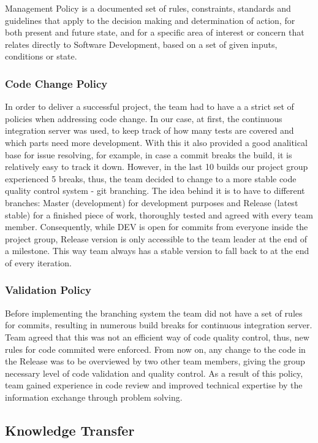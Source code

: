 \documentclass[10pt]{article}
\begin{document}
Management Policy is a documented set of rules, constraints, standards and guidelines that apply to the decision making and determination of action, for both present and future state, and for a specific area of interest or concern that relates directly to Software Development, based on a set of given inputs, conditions or state.

\subsubsection{Code Change Policy}

In order to deliver a successful project, the team had to have a a strict set of policies when addressing code change. In our case, at first, the continuous integration server was used, to keep track of how many tests are covered and which parts need more development. With this it also provided a good analitical base for issue resolving, for example, in case a commit breaks the build, it is relatively easy to track it down.
However, in the last 10 builds our project group experienced 5 breaks, thus, the team decided to change to a more stable code quality control system - git branching. The idea behind it is to have to different branches: Master (development) for development purposes and Release (latest stable) for a finished piece of work, thoroughly tested and agreed with every team member. Consequently, while DEV is open for commits from everyone inside the project group, Release version is only accessible to the team leader at the end of a milestone. This way team always has a stable version to fall back to at the end of every iteration.

\subsubsection{Validation Policy}

Before implementing the branching system the team did not have a set of rules for commits, resulting in numerous build breaks for continuous integration server. Team agreed that this was not an efficient way of code quality control, thus, new rules for code commited were enforced. From now on, any change to the code in the Release was to be overviewed by two other team members, giving the group necessary level of code validation and quality control. As a result of this policy, team gained experience in code review and improved technical expertise by the information exchange through problem solving.

\subsection{Knowledge Transfer}
\end{document}
